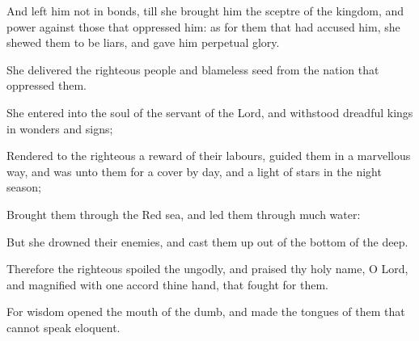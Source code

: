 {\par }{\PP {}And left him not in bonds, till she brought him the sceptre of the kingdom, and power against those that oppressed him: as for them that had accused him, she shewed them to be liars, and gave him perpetual glory.
\par }{\PP {}She delivered the righteous people and blameless seed from the nation that oppressed them.
\par }{\PP {}She entered into the soul of the servant of the Lord, and withstood dreadful kings in wonders and signs;
\par }{\PP {}Rendered to the righteous a reward of their labours, guided them in a marvellous way, and was unto them for a cover by day, and a light of stars in the night season;
\par }{\PP {}Brought them through the Red sea, and led them through much water:
\par }{\PP {}But she drowned their enemies, and cast them up out of the bottom of the deep.
\par }{\PP {}Therefore the righteous spoiled the ungodly, and praised thy holy name, O Lord, and magnified with one accord thine hand, that fought for them.
\par }{\PP {}For wisdom opened the mouth of the dumb, and made the tongues of them that cannot speak eloquent.

}
